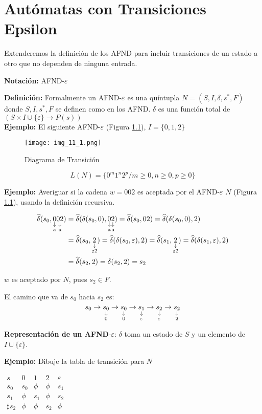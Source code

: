 \chapter{Autómatas con Transiciones Epsilon}
Extenderemos la definición de los AFND para incluir transiciones de un estado a otro que no dependen de ninguna entrada.

\textbf{Notación: }AFND-$\varepsilon$

\textbf{Definición: }Formalmente un AFND-$\varepsilon$ es una quíntupla $N=(S,I,\delta,s^*,F)$ donde $S,I,s^*,F$ se definen como en los AFND. $\delta$ es una función total de $(S\times I \cup\{\varepsilon\} \rightarrow P(s))$\\

\textbf{Ejemplo: }El siguiente AFND-$\varepsilon$ (Figura \ref{img_11_1}), $I=\{0,1,2\}$

\begin{figure}[h!]
\centering
\texttt{[image: img\_11\_1.png]}
\caption{Diagrama de Transición} \label{img_11_1}
\end{figure}
$$L(N)=\{0^m1^n2^p/m\geq0,n\geq 0,p\geq 0\}$$

\textbf{Ejemplo: }Averiguar si la cadena $w=002$ es aceptada por el AFND-$\varepsilon$ $N$ (Figura \ref{img_11_1}), usando la definición recursiva.

\begin{align*}
\widehat{\delta}(s_0,\downlegend{0}{a}\downlegend{02}{u}) &=\widehat{\delta}(\delta(s_0,0),\downlegend{0}{a}\downlegend{2}{u})=\widehat{\delta}(s_0,02)=\widehat{\delta}(\delta(s_0,0),2) \\
&=\widehat{\delta}(s_0,\downlegend{2}{$\varepsilon 2$})=\widehat{\delta}(\delta(s_0,\varepsilon),2)=\widehat{\delta}(s_1,\downlegend{2}{$\varepsilon 2$})=\widehat{\delta}(\delta(s_1,\varepsilon),2)\\
&=\widehat{\delta}(s_2,2)=\delta(s_2,2)=s_2
\end{align*}

$w$ es aceptado por $N$, pues $s_2\in F$.

El camino que va de $s_0$ hacia $s_2$ es: 
$$s_0\rightarrow \downlegend{s_0}{0}\rightarrow \downlegend{s_0}{0}\rightarrow \downlegend{s_1}{$\varepsilon$}\rightarrow \downlegend{s_2}{$\varepsilon$} \rightarrow \downlegend{s_2}{2}$$

\textbf{Representación de un AFND}-$\varepsilon$: $\delta$ toma un estado de $S$ y un elemento de $I\cup \{\varepsilon\}$.

\textbf{Ejemplo: }Dibuje la tabla de transición para $N$
\begin{center}
$\begin{array}{c|cccc}
s		&0		&1		&2		& \varepsilon	\\ \hline
s_0		&s_0	&\phi	&\phi	&s_1	\\
s_1		&\phi	&s_1	&\phi	&s_2	\\
\sharp s_2	&\phi	&\phi	&s_2	&\phi
\end{array}$
\end{center}

